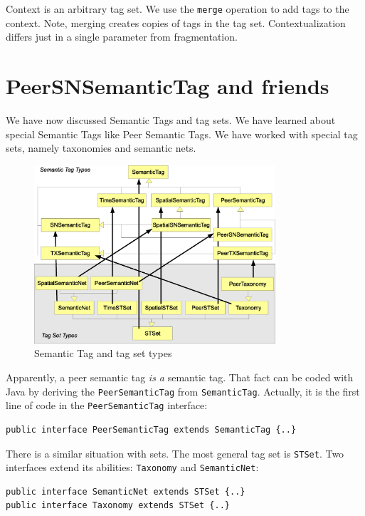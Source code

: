 Context is an arbitrary tag set. We use the {\tt merge} operation to add tags to the context. Note, merging creates copies of tags in the tag  set. Contextualization differs just in a single parameter from fragmentation.

\section{PeerSNSemanticTag and friends}
We have now discussed Semantic Tags and tag sets. We have learned about special Semantic Tags like Peer Semantic Tags. We have worked with special tag sets, namely taxonomies and semantic nets.

\begin{figure}[t]
\centering
\includegraphics[width=0.80\textwidth]{tagsSetTypes.eps}
\caption{Semantic Tag and tag set types}
\label{fig:tagsSetTypes}
\end{figure}

Apparently, a peer semantic tag {\it is a} semantic tag. That fact can be coded with Java by deriving the {\tt PeerSemanticTag} from {\tt SemanticTag}.  Actually, it is the first line of code in the {\tt PeerSemanticTag} interface:

\begin{verbatim}
public interface PeerSemanticTag extends SemanticTag {..}
\end{verbatim}

There is a similar situation with sets. The most general tag set is {\tt STSet}. Two interfaces extend its abilities: {\tt Taxonomy} and {\tt SemanticNet}:

\begin{verbatim}
public interface SemanticNet extends STSet {..}
public interface Taxonomy extends STSet {..}
\end{verbatim}

